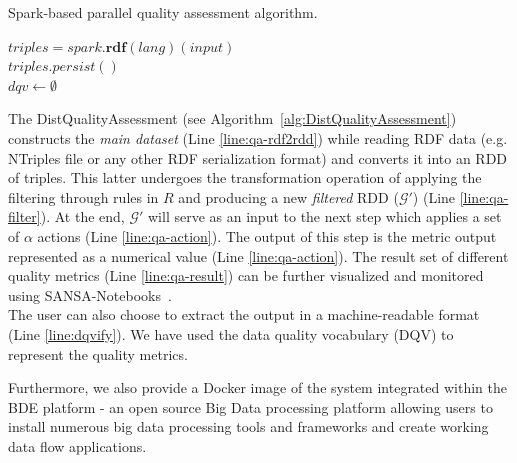 \begin{algorithm}
\caption{Spark-based parallel quality assessment algorithm.}
\label{alg:DistQualityAssessment}
    $\textit{triples} = spark.\textbf{rdf}(lang)(input)$ \label{line:qa-rdf2rdd} \\
    $\textit{triples}.persist()$ \label{line:qa-cache}\\
    $dqv \leftarrow \emptyset$ \\
 \label{line:qa-result}
\end{algorithm}

The DistQualityAssessment (see Algorithm~\ref{alg:DistQualityAssessment}) constructs the \emph{main dataset} (Line \ref{line:qa-rdf2rdd}) while reading RDF data (e.g. NTriples file or any other RDF serialization format) and converts it into an RDD of triples.
This latter undergoes the transformation operation of applying the filtering through rules in $R$ and producing a new \emph{filtered} RDD ($\mathcal{G'}$) (Line \ref{line:qa-filter}).
At the end, $\mathcal{G'}$ will serve as an input to the next step which applies a set of $\alpha$ actions (Line \ref{line:qa-action}).
The output of this step is the metric output represented as a numerical value (Line \ref{line:qa-action}). 
The result set of different quality metrics (Line \ref{line:qa-result}) can be further visualized and monitored using SANSA-Notebooks~\cite{iermilov-2017-sansa-iswc-demo}.\\
The user can also choose to extract the output in a machine-readable format (Line \ref{line:dqvify}). 
We have used the data quality vocabulary (DQV) to represent the quality metrics. 

Furthermore, we also provide a Docker image of the system integrated within the BDE platform - an open source Big Data processing platform allowing users to install numerous big data processing tools and frameworks and create working data flow applications.


